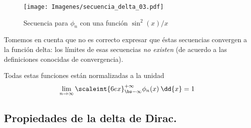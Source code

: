 \begin{figure}[H]
    \centering
    \texttt{[image: Imagenes/secuencia\_delta\_03.pdf]}
    \caption{Secuencia para $\phi_{n}$ con una función $\sin^{2}(x)/x$}
    \label{fig:plot_secuencia_03}
\end{figure}
Tomemos en cuenta que no es correcto expresar que éstas secuencias convergen a la función delta: los límites de esas secuencias \emph{no existen} (de acuerdo a las definiciones conocidas de convergencia).

Todas estas funciones están normalizadas a la unidad
\begin{equation}
\lim_{n \to \infty} \scaleint{6ex}_{\bs - \infty}^{+ \infty} \phi_{n}(x) \: \dd{x} = 1
\label{eq:ecuacion_delta_05}
\end{equation}

\subsection{Propiedades de la delta de Dirac.}


